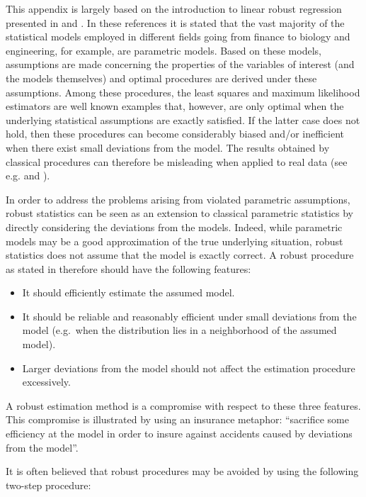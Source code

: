 \documentclass[]{book}
\providecommand{\tightlist}{%
  \setlength{\itemsep}{0pt}\setlength{\parskip}{0pt}}
\theoremstyle{definition}
\theoremstyle{definition}
\theoremstyle{definition}
\theoremstyle{remark}
\begin{document}
This appendix is largely based on the introduction to linear robust
regression presented in \citet{ronchetti2006historical} and
\citet{duncan2016ela}. In these references it is stated that the vast
majority of the statistical models employed in different fields going
from finance to biology and engineering, for example, are parametric
models. Based on these models, assumptions are made concerning the
properties of the variables of interest (and the models themselves) and
optimal procedures are derived under these assumptions. Among these
procedures, the least squares and maximum likelihood estimators are well
known examples that, however, are only optimal when the underlying
statistical assumptions are exactly satisfied. If the latter case does
not hold, then these procedures can become considerably biased and/or
inefficient when there exist small deviations from the model. The
results obtained by classical procedures can therefore be misleading
when applied to real data (see e.g. \citet{ronchetti2006historical} and
\citet{huber2009robust}).

In order to address the problems arising from violated parametric
assumptions, robust statistics can be seen as an extension to classical
parametric statistics by directly considering the deviations from the
models. Indeed, while parametric models may be a good approximation of
the true underlying situation, robust statistics does not assume that
the model is exactly correct. A robust procedure as stated in
\citet{huber2009robust} therefore should have the following features:

\begin{itemize}
\tightlist
\item
  It should efficiently estimate the assumed model.
\item
  It should be reliable and reasonably efficient under small deviations
  from the model (e.g.~when the distribution lies in a neighborhood of
  the assumed model).
\item
  Larger deviations from the model should not affect the estimation
  procedure excessively.
\end{itemize}

A robust estimation method is a compromise with respect to these three
features. This compromise is illustrated by
\citet{anscombe1960rejection} using an insurance metaphor: ``sacrifice
some efficiency at the model in order to insure against accidents caused
by deviations from the model''.

It is often believed that robust procedures may be avoided by using the
following two-step procedure:
\end{document}
